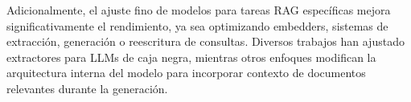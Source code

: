 Adicionalmente, el ajuste fino de modelos para tareas RAG específicas mejora significativamente el rendimiento, ya sea optimizando embedders\cite{xiong_approximate_2020}, sistemas de extracción\cite{khattab_relevance-guided_2021}\cite{izacard_atlas_2022}, generación\cite{asai_self-rag_2024}\cite{krishna_rankgen_2022} o reescritura de consultas\cite{ma_query_nodate}. Diversos trabajos han ajustado extractores para LLMs de caja negra\cite{yu_augmentation-adapted_2023}\cite{shi_replug_2023}\cite{lin_ra-dit_2024}\cite{yang_prca_2023}, mientras otros enfoques modifican la arquitectura interna del modelo para incorporar contexto de documentos relevantes durante la generación\cite{guu_realm_2020}.






